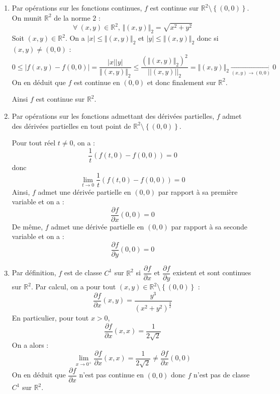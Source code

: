 \documentclass[a4paper,10pt]{report}
\begin{document}
\corr
\begin{enumerate}

\item Par opérations sur les fonctions continues, $f$ est continue sur  $\mathbb{R}^2 \setminus \left\{ {(0,0)} \right\}$.
On munit $\mathbb{R}^2$ de la norme $2$ :
$$\forall\:(x,y)\in\mathbb{R}^2, \,  \Vert (x,y) \Vert_2 = \sqrt{x^2+y^2}$$
Soit $(x,y)\in\mathbb{R}^2$. On a $|x|\leq \Vert (x,y) \Vert_2$ et $|y|\leq \Vert (x,y) \Vert_2$ donc si $(x,y) \neq (0,0)$ :
$$ 0 \leq |f(x,y)-f(0,0)|=\dfrac{|x||y|}{\Vert (x,y) \Vert_2}\leq\dfrac{\left(\Vert (x,y) \Vert_2\right) ^2}{||(x,y)||_2}=\Vert (x,y) \Vert_2\underset{(x,y)\to (0,0)}{\longrightarrow} 0$$
On en déduit que $f$ est continue en $(0,0)$ et donc finalement sur $\mathbb{R}^2$.

\medskip
Ainsi $f$ est continue sur $\mathbb{R}^2 $.\\
\item Par opérations sur les fonctions admettant des dérivées partielles, $f$ admet des dérivées partielles en tout point de $\mathbb{R}^2 \setminus \left\{ {(0,0)} \right\}$.

\medskip

\noindent Pour tout réel $t \neq 0$, on a :
$$ \dfrac{1}{t}\left( {f(t,0) - f(0,0)} \right) = 0$$
donc 
$$\mathop {\lim }\limits_{t \to 0} \dfrac{1}{t}\left( {f(t,0) - f(0,0)} \right) = 0$$
Ainsi, $f$ admet une dérivée partielle en $(0,0)$ par rapport à sa première variable et on a :
$$\dfrac{{\partial f}}{{\partial x}}(0,0) = 0$$
De même, $f$ admet une  dérivée partielle en $(0,0)$ par rapport à sa seconde variable et on a :
$$\dfrac{{\partial f}}{{\partial y}}(0,0) = 0$$
\item Par définition, $f$ est de classe $C^{1}$ sur $\mathbb{R}^{2}$ si $\dfrac{\partial f}{ \partial x}$ et $\dfrac{\partial f}{ \partial y }$ existent et sont continues sur $\mathbb{R}^{2}$. Par calcul, on a pour tout $(x,y)\in\mathbb{R}^2 \setminus \left\{ {(0,0)} \right\}$ :
$$\dfrac{\partial f}{ \partial x}(x,y)=\dfrac{y^3}{\left( x^2+y^2\right)^{\frac{3}{2}} }$$
En particulier, pour tout $x>0$,   
$$\dfrac{\partial f}{ \partial x}(x,x)=\dfrac{1}{2\sqrt{2}}$$
On a alors :
$$\lim\limits_{x\to 0^{+}}^{}\dfrac{\partial f}{ \partial x}(x,x)=\dfrac{1}{2\sqrt{2}}\neq \dfrac{\partial f}{ \partial x}(0,0) $$
On en déduit que $\dfrac{\partial f}{ \partial x}$ n'est pas continue  en $(0,0)$ donc $f$ n'est pas de classe $C^{1}$ sur $\mathbb{R}^{2}$.

\end{enumerate}
\end{document}
